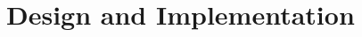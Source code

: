\documentclass[
	12pt,
	a4paper,
	abstract,
	bibliography=totoc,
	chapterprefix,
	headings=openright,
	numbers=endperiod,
	parskip=half,
	twoside,
]{scrreprt}
\begin{document}
\chapter{Design and Implementation}
\label{cha:design and implementation}

%

%	
%
%
%
\end{document}
